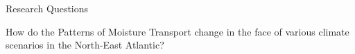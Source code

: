 \begin{frame}{Research Questions}
  \begin{center}
    {\huge
      How do the Patterns of Moisture Transport change in the face of various climate scenarios in the North-East Atlantic?
    }
    
  \end{center}  

\end{frame}
